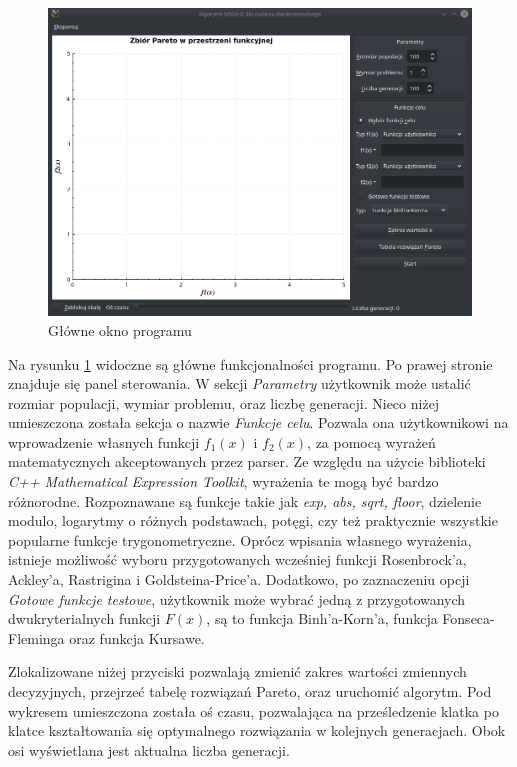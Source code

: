 \documentclass[11pt,a4paper]{article}
\begin{document}
\begin{figure}[H]
\centering
\includegraphics[width=14cm]{program}
\caption{Główne okno programu}
\label{fig:program}
\end{figure}

Na rysunku \ref{fig:program} widoczne są główne funkcjonalności programu. Po prawej stronie znajduje się panel sterowania. W sekcji \textit{Parametry} użytkownik może ustalić rozmiar populacji, wymiar problemu, oraz liczbę generacji. Nieco niżej umieszczona została sekcja o nazwie \textit{Funkcje celu}. Pozwala ona użytkownikowi na wprowadzenie własnych funkcji \(f_1(x)\) i \(f_2(x)\), za pomocą wyrażeń matematycznych akceptowanych przez parser. Ze względu na użycie biblioteki \textit{C++ Mathematical Expression Toolkit}, wyrażenia te mogą być bardzo różnorodne. Rozpoznawane są funkcje takie jak \textit{exp, abs, sqrt, floor}, dzielenie modulo, logarytmy o różnych podstawach, potęgi, czy też praktycznie wszystkie popularne funkcje trygonometryczne. Oprócz wpisania własnego wyrażenia, istnieje możliwość wyboru przygotowanych wcześniej funkcji  Rosenbrock'a,  Ackley'a,  Rastrigina i Goldsteina-Price'a. Dodatkowo, po zaznaczeniu opcji \textit{Gotowe funkcje testowe}, użytkownik może wybrać jedną z przygotowanych dwukryterialnych funkcji \(F(x)\), są to funkcja Binh'a-Korn'a, funkcja Fonseca-Fleminga oraz funkcja Kursawe.

Zlokalizowane niżej przyciski pozwalają zmienić zakres wartości zmiennych decyzyjnych, przejrzeć tabelę rozwiązań Pareto, oraz uruchomić algorytm. Pod wykresem umieszczona została oś czasu, pozwalająca na prześledzenie klatka po klatce kształtowania się optymalnego rozwiązania w kolejnych generacjach. Obok osi wyświetlana jest aktualna liczba generacji. 
\end{document}

